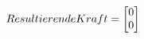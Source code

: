 \documentclass[preview]{standalone}
\begin{document}
\begin{align*}
\special{dvisvgm:raw <g id='unique000'>}Resultierende Kraft =  \begin{bmatrix}0 \\0\end{bmatrix}\special{dvisvgm:raw </g>}
\end{align*}
\end{document}
